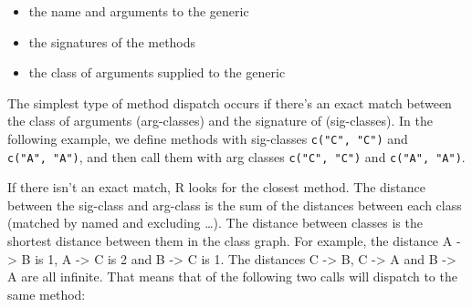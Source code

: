 \begin{itemize}
\tightlist
\item
  the name and arguments to the generic
\item
  the signatures of the methods
\item
  the class of arguments supplied to the generic
\end{itemize}

The simplest type of method dispatch occurs if there's an exact match
between the class of arguments (arg-classes) and the signature of
(sig-classes). In the following example, we define methods with
sig-classes \texttt{c("C",\ "C")} and \texttt{c("A",\ "A")}, and then
call them with arg classes \texttt{c("C",\ "C")} and
\texttt{c("A",\ "A")}.

\begin{Shaded}
\begin{Highlighting}[]
\NormalTok{(}\NormalTok{, }\NormalTok{(}\NormalTok{, }\NormalTok{), }\NormalTok{)}
\NormalTok{(}\NormalTok{, }\NormalTok{(}\NormalTok{, }\NormalTok{), }\NormalTok{)}

\end{Highlighting}
\end{Shaded}

If there isn't an exact match, R looks for the closest method. The
distance between the sig-class and arg-class is the sum of the distances
between each class (matched by named and excluding \ldots{}). The
distance between classes is the shortest distance between them in the
class graph. For example, the distance A -\textgreater{} B is 1, A
-\textgreater{} C is 2 and B -\textgreater{} C is 1. The distances C
-\textgreater{} B, C -\textgreater{} A and B -\textgreater{} A are all
infinite. That means that of the following two calls will dispatch to
the same method:

\begin{Shaded}
\begin{Highlighting}[]
\end{Highlighting}
\end{Shaded}

